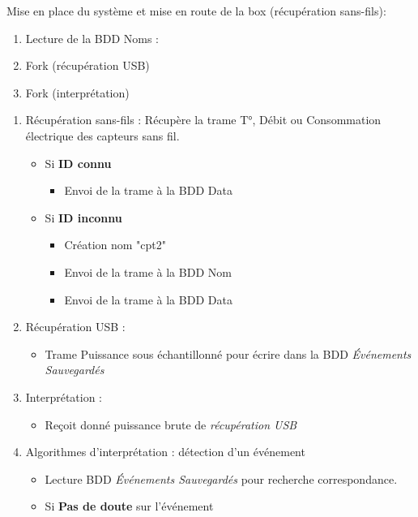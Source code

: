 \documentclass[10pt,a4paper]{article}
\begin{document}
Mise en place du système et mise en route de la box (récupération sans-fils):
\begin{enumerate}
	\item Lecture de la BDD Noms : 
	\item Fork (récupération USB)
	\item Fork (interprétation) 
\end{enumerate}
\begin{enumerate}
	\item Récupération sans-fils : Récupère la trame T°, Débit ou Consommation électrique des capteurs sans fil.
	\begin{itemize}
		\item Si \textbf{ID connu}  
		\begin{itemize}
			\item Envoi de la trame à la BDD Data  	
		\end{itemize} 
	\end{itemize}
	\begin{itemize}
		\item Si \textbf{ID inconnu}
		\begin{itemize}
			\item Création nom "cpt2"
			\item Envoi de la trame à la BDD Nom 
			\item Envoi de la trame à la BDD Data 
		\end{itemize}
	\end{itemize}
	\item Récupération USB : 
	\begin{itemize}
		\item Trame Puissance sous échantillonné pour écrire dans la BDD  \textit{Événements Sauvegardés}
	\end{itemize}
	\item Interprétation : 
	\begin{itemize}
		\item Reçoit donné puissance brute de \textit{récupération USB}
	\end{itemize}	 
	\item Algorithmes d'interprétation : détection d'un événement
	\begin{itemize}		
		\item Lecture BDD  \textit{Événements Sauvegardés} pour recherche correspondance.
		\item Si \textbf{Pas de doute} sur l'événement

\end{itemize}
\end{enumerate}
\end{document}
